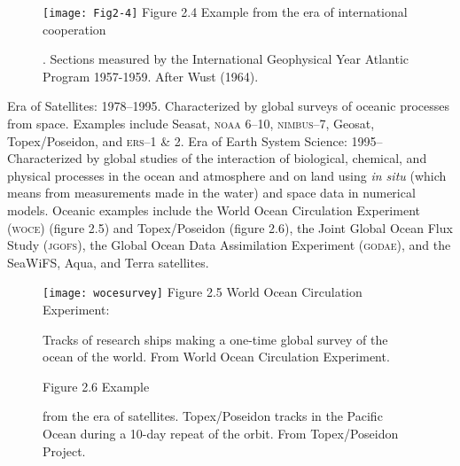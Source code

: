 \begin{enumerate}
\begin{figure}[t!]
\texttt{[image: Fig2-4]}
\centering
\footnotesize
Figure 2.4  Example from the era of international cooperation
\rule{0pt}{3ex}. Sections measured by the International
Geophysical Year Atlantic Program 1957-1959. After Wust (1964).

\label{fig:Fig2-4}
\vspace{-3ex}
\end{figure}

\vitem Era of Satellites: 1978--1995. Characterized by global
surveys of oceanic processes from space. Examples include Seasat,
\textsc{noaa} 6--10, \textsc{nimbus}--7, Geosat,
Topex/\-Poseidon, and \textsc{ers}--1 \& 2. \vitem
Era of Earth System Science: 1995-- Characterized by global studies of the interaction of
biological, chemical, and physical processes in the ocean and atmosphere and on land using \textit{in situ}  (which means from measurements made in the water) and space data in numerical models. Oceanic examples include the World Ocean Circulation
Experiment (\textsc{woce}) (figure 2.5) and Topex/Poseidon (figure 2.6), the Joint Global Ocean Flux Study  (\textsc{jgofs}), the Global Ocean Data Assimilation Experiment (\textsc {godae}), and the SeaWiFS, Aqua, and Terra satellites.
\end{enumerate}

\begin{figure}[t!]
\texttt{[image: wocesurvey]}
\centering
\footnotesize
Figure 2.5 World Ocean Circulation
Experiment:\rule{0pt}{4ex} Tracks of research ships making a one-time global survey of the
ocean of the world. From World Ocean Circulation Experiment.

\label{fig:wocesurvey}
\vspace{-3ex}
\end{figure}

\begin{figure}[b!]
\vspace{-1ex}
\centering
\footnotesize
Figure 2.6 Example \rule{0mm}{3ex}from the era of satellites.
Topex/Poseidon tracks in the Pacific\\Ocean during a 10-day
repeat of the orbit. From Topex/Poseidon Project.

\label{fig:Fig2-6}
\end{figure}

